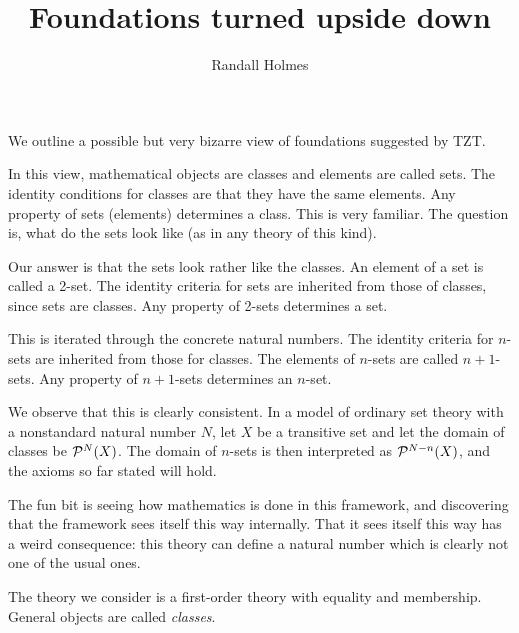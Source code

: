 \documentclass[12pt]{article}
\title{Foundations turned upside down}
\author{Randall Holmes}
\begin{document}
\maketitle

We outline a possible but very bizarre view of foundations suggested by TZT.

In this view, mathematical objects are classes and elements are called sets.  The identity conditions for classes are that they have the same elements.  Any property of sets
(elements) determines a class.  This is very familiar.  The question is, what do the sets look like (as in any theory of this kind).

Our answer is that the sets look rather like the classes.  An element of a set is called a 2-set.  The identity criteria for sets are inherited from those of classes, since sets are classes.
Any property of 2-sets determines a set.

This is iterated through the concrete natural numbers.  The identity criteria for $n$-sets are inherited from those for classes. The elements of $n$-sets are called $n+1$-sets.
Any property of $n+1$-sets determines an $n$-set.

We observe that this is clearly consistent.  In a model of ordinary set theory with a nonstandard natural number $N$, let $X$ be a transitive set and let the domain of
classes be ${\cal P}^N(X)$.  The domain of $n$-sets is then interpreted as ${\cal P}^{N-n}(X)$, and the axioms so far stated will hold.

The fun bit is seeing how mathematics is done in this framework, and discovering that the framework sees itself this way internally.  That it sees itself this way has a weird consequence:  this theory can define a natural number which is clearly not one of the usual ones.

The theory we consider is a first-order theory with equality and membership.  General objects are called {\em classes\/}.
\end{document}
